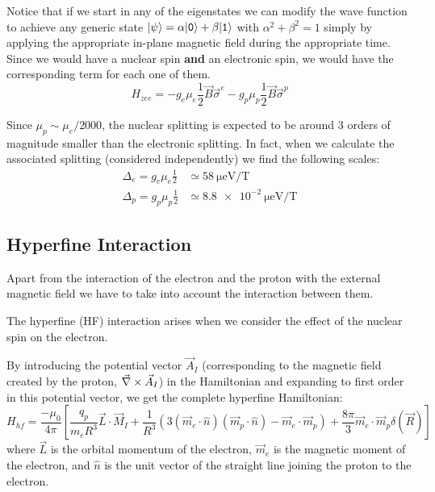 Notice that if we start in any of the eigenstates we can modify the wave function to achieve any generic state $|\psi\rangle = \alpha|\texttt{0}\rangle+\beta|\texttt{1}\rangle$ with $\alpha^2+\beta^2 = 1$ simply by applying the appropriate in-plane magnetic field during the appropriate time.\\


Since we would have a nuclear spin \textbf{and} an electronic spin, we would have the corresponding term for each one of them.
\begin{equation}
  H_{zee} = -g_e\mu_e\frac{1}{2}\vec{B}\vec{\sigma}^e - g_p\mu_p\frac{1}{2}\vec{B}\vec{\sigma}^p
\end{equation}

Since $\mu_p\sim\mu_e/2000$, the nuclear splitting is expected to be around 3 orders of magnitude smaller than the electronic splitting. In fact, when we calculate the associated splitting (considered independently) we find the following scales:
\begin{equation}
  \begin{split}
    \Delta_e = g_e\mu_e\frac{1}{2} &\simeq \SI{58}{\micro\eV\per\tesla} \\  %
    \Delta_p = g_p\mu_p\frac{1}{2} &\simeq \SI{8.8e-2}{\micro\eV\per\tesla}
  \end{split}
\end{equation}



\subsection{Hyperfine Interaction}
\label{sec:hyperfine}
Apart from the interaction of the electron and the proton with the external magnetic field we have to take into account the interaction between them.

The hyperfine (HF) interaction arises when we consider the effect of the nuclear spin on the electron.

By introducing the potential vector $\vec{A}_{I}$ (corresponding to the magnetic field created by the proton, $\vec{\nabla}\times\vec{A}_{I}$) in the Hamiltonian and expanding to first order in this potential vector, we get the complete hyperfine Hamiltonian:~\cite{Cohen1977book}
\begin{equation}
H_{hf} = \frac{-\mu_{0}}{4\pi}\left[
\frac{q_{p}}{m_{e}R^{3}}\vec{L}\cdot\vec{M}_{I} +
\frac{1}{R^{3}}\left(3(\vec{m}_{e}\cdot\hat{n})
                      (\vec{m}_{p}\cdot\hat{n})-
                      \vec{m}_{e}\cdot\vec{m}_{p}\right) +
\frac{8\pi}{3}\vec{m}_{e}\cdot\vec{m}_{p}\delta(\vec{R})
\right]
\label{full_HF}
\end{equation}
where $\vec{L}$ is the orbital momentum of the electron, $\vec{m}_{e}$ is the magnetic moment of the electron, and $\hat{n}$ is the unit vector of the straight line joining the proton to the electron.\\

